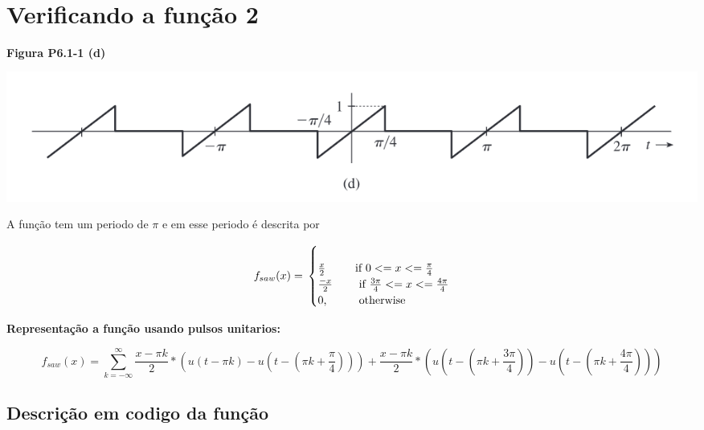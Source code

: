 \documentclass{article}
\begin{document}
    \begin{center}
    \end{center}
    { \hspace*{\fill} \\}
    
    \hypertarget{verificando-a-funuxe7uxe3o-2}{%
\section{Verificando a função 2}\label{verificando-a-funuxe7uxe3o-2}}

\textbf{Figura P6.1-1 (d)}

\includegraphics{assets/f2.png}

A função tem um periodo de \(\pi\) e em esse periodo é descrita por

\[
f_{saw}(x) = \\
  \begin{cases} \\
    \frac{x}{2} & \quad \text{if }  0 <= x <= \frac{\pi}{4} \\
    \frac{-x}{2} & \quad \text{ if }  \frac{3\pi}{4} <= x <= \frac{4\pi}{4} \\
    \text{0, } & \quad \text{ otherwise} \\
  \end{cases}
\]

\textbf{Representação a função usando pulsos unitarios:}

\[
f_{saw}(x) = 
  \sum_{k = -\infty}^{\infty} 
    \frac{x - \pi k}{2} * 
      (u(t - \pi k) - 
      u(t - (\pi k + \frac{\pi}{4}))) +
    \frac{x - \pi k}{2} * 
      (u(t - (\pi k + \frac{3\pi}{4})) - 
      u(t - (\pi k + \frac{4\pi}{4})))       
\]

    \hypertarget{descriuxe7uxe3o-em-codigo-da-funuxe7uxe3o}{%
\subsection{Descrição em codigo da
função}\label{descriuxe7uxe3o-em-codigo-da-funuxe7uxe3o}}
\end{document}
